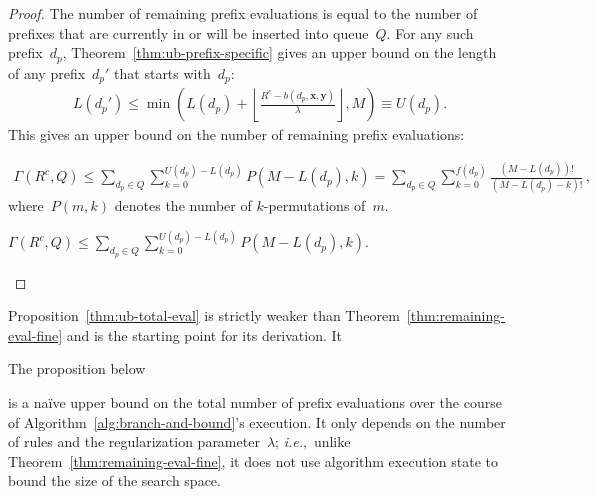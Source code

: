 \documentclass[twoside,11pt]{article}
\def\ie{{\it i.e.},~}
\newcommand{\x}{\mathbf{x}}
\newcommand{\y}{\mathbf{y}}
\def\Prefix{d_p}
\def\Reg{{\lambda}}
\def\CurrentObj{{R^c}}
\def\Remaining{\Gamma}
\def\Queue{Q}
\newcommand{\nn}{\nonumber}
\begin{document}
\begin{proof}
The number of remaining prefix evaluations is equal to the number of
prefixes that are currently in or will be inserted into queue~$\Queue$.
%
For any such prefix~$\Prefix$, Theorem~\ref{thm:ub-prefix-specific}
gives an upper bound on the length of any prefix~$\Prefix'$
that starts with~$\Prefix$:
\begin{align}
L(\Prefix') \le \min \left( L(\Prefix) + \left\lfloor \frac{\CurrentObj - b(\Prefix, \x, \y)}{\Reg} \right\rfloor, M \right)
\equiv U(\Prefix). \nn
\end{align}
This gives an upper bound on the number of remaining prefix evaluations:
\begin{arxiv}
\begin{align}
\Remaining(\CurrentObj, \Queue)
\le \sum_{\Prefix \in Q} \sum_{k=0}^{U(\Prefix) - L(\Prefix)} P(M - L(\Prefix), k)
= \sum_{\Prefix \in Q} \sum_{k=0}^{f(\Prefix)} \frac{(M - L(\Prefix))!}{(M - L(\Prefix) - k)!}\,, \nn
\end{align}
where~$P(m, k)$ denotes the number of $k$-permutations of~$m$.
\end{arxiv}
\begin{kdd}
${\Remaining(\CurrentObj, \Queue)
\le \sum_{\Prefix \in Q} \sum_{k=0}^{U(\Prefix) - L(\Prefix)} P(M - L(\Prefix), k)}$.
\end{kdd}
\end{proof}

\begin{arxiv}
Proposition~\ref{thm:ub-total-eval} is strictly weaker than
Theorem~\ref{thm:remaining-eval-fine} and is the starting point for its derivation.
It
\end{arxiv}
\begin{kdd}
The proposition below
\end{kdd}
is a na\"ive upper bound on
the total number of prefix evaluations over the course of
Algorithm~\ref{alg:branch-and-bound}'s execution.
%
It only depends on the number of rules and
the regularization parameter~$\Reg$;
\ie unlike Theorem~\ref{thm:remaining-eval-fine},
it does not use algorithm execution state to
bound the size of the search space.
\end{document}
